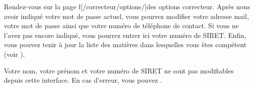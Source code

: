 ﻿Rendez-vous sur la page \l[/correcteur/options/]{des options correcteur}.
Après nous avoir indiqué votre mot de passe actuel, vous pourrez modifier votre adresse mail, votre mot de passe ainsi que votre numéro de téléphone de contact.
Si vous ne l'avez pas encore indiqué, vous pourrez entrer ici votre numéro de SIRET.
Enfin, vous pouvez tenir à jour la liste des matières dans lesquelles vous êtes compétent (voir ).

Votre nom, votre prénom et votre numéro de SIRET ne sont pas modifiables depuis cette interface. En cas d'erreur, vous pouvez .